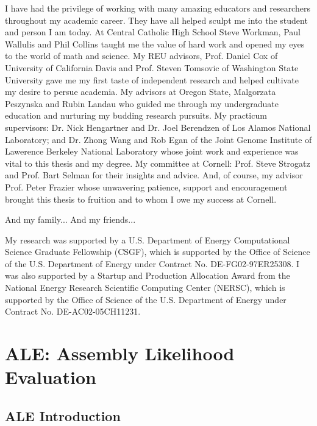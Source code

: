 \documentclass[phd,tocprelim]{cornell}
\begin{document}
\begin{acknowledgements}
I have had the privilege of working with many amazing educators and researchers throughout my academic career. They have all helped sculpt me into the student and person I am today. At Central Catholic High School Steve Workman, Paul Wallulis and Phil Collins taught me the value of hard work and opened my eyes to the world of math and science. My REU advisors, Prof. Daniel Cox of University of California Davis and Prof. Steven Tomsovic of Washington State University gave me my first taste of independent research and helped cultivate my desire to persue academia. My advisors at Oregon State, Malgorzata Peszynska and Rubin Landau who guided me through my undergraduate education and nurturing my budding research pursuits. My practicum supervisors: Dr. Nick Hengartner and Dr. Joel Berendzen of Los Alamos National Laboratory; and Dr. Zhong Wang and Rob Egan of the Joint Genome Institute of Lawerence Berkeley National Laboratory whose joint work and experience was vital to this thesis and my degree. My committee at Cornell: Prof. Steve Strogatz and Prof. Bart Selman for their insights and advice. And, of course, my advisor Prof. Peter Frazier whose unwavering patience, support and encouragement brought this thesis to fruition and to whom I owe my success at Cornell.

And my family... And my friends...

My research was supported by a U.S. Department of Energy Computational Science Graduate Fellowship (CSGF), which is supported by the Office of Science of the U.S. Department of Energy under Contract No. DE-FG02-97ER25308. I was also supported by a Startup and Production Allocation Award from the National Energy Research Scientific Computing Center (NERSC), which is supported by the Office of Science of the U.S. Department of Energy under Contract No. DE-AC02-05CH11231.
\end{acknowledgements}

\contentspage
\tablelistpage
\figurelistpage

\normalspacing \setcounter{page}{1} 
\pagestyle{cornell} \addtolength{\parskip}{0.5\baselineskip}

\part{ALE: Assembly Likelihood Evaluation} %
\label{prt:ALE: Assembly Likelihood Evaluation}

\chapter{ALE Introduction} %
\label{cha:ALE Introduction}
\end{document}
